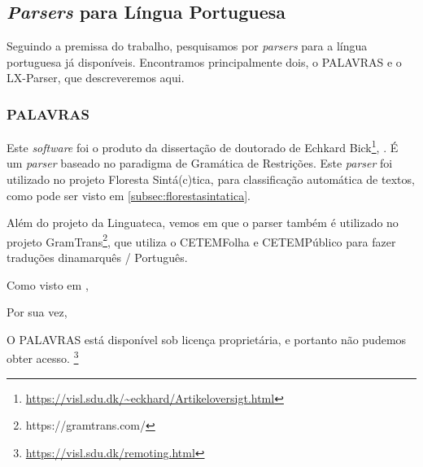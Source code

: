 \subsection{\textit{Parsers} para Língua Portuguesa}
\label{parser_portugues}
Seguindo a premissa do trabalho, pesquisamos por \textit{parsers} para a língua portuguesa já disponíveis. Encontramos principalmente dois, o PALAVRAS e o LX-Parser, que descreveremos aqui.


\subsubsection{PALAVRAS}\label{subsec:palavras}
Este \textit{software} foi o produto da dissertação de doutorado de Echkard Bick\footnote{\url{https://visl.sdu.dk/~eckhard/Artikeloversigt.html}}, . É um \textit{parser} baseado no paradigma de Gramática de Restrições. Este \textit{parser} foi utilizado no projeto Floresta Sintá(c)tica, para classificação automática de textos, como pode ser visto em \ref{subsec:florestasintatica}.

Além do projeto da Linguateca, vemos em  que o parser também é utilizado no projeto GramTrans\footnote{https://gramtrans.com/}, que utiliza o CETEMFolha e CETEMPúblico para fazer traduções dinamarquês / Português.

Como visto em , 
\begin{quote}
\end{quote}
Por sua vez,
\begin{quote}
\end{quote}
O PALAVRAS está disponível sob licença proprietária, e portanto não pudemos obter acesso. \footnote{\url{https://visl.sdu.dk/remoting.html}}

